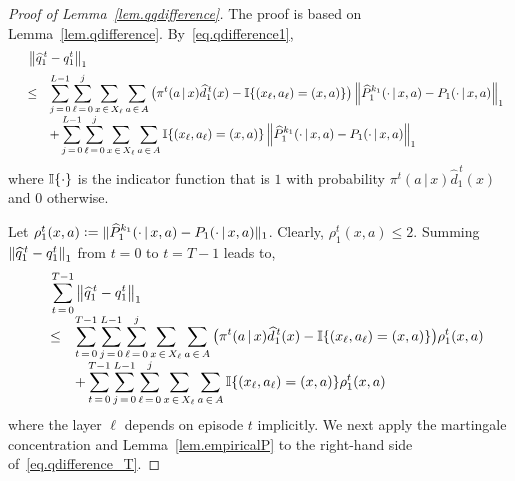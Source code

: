 \documentclass[12pt, final]{l4dc2023}
\begin{document}
\begin{proof}[Proof of Lemma~\ref{lem.qqdifference}]
	The proof is based on Lemma~\ref{lem.qdifference}. By~\eqref{eq.qdifference1}, 
	\[
	\begin{array}{rcl}
	&& \!\!\!\! \!\!\!\! \!\!
	\displaystyle
	\norm{\hat q_1^{\,t} - q_1^t}_1
	\\[0.2cm]
	&\leq&\displaystyle\sum_{j\,=\,0}^{L-1} \sum_{\ell\,=\,0}^{j}\sum_{x\,\in\,X_\ell}\sum_{a\,\in\,A}  \big(\pi^t(a\,\vert\,x) \hat d_1^{\,t}(x) - \Ind{(x_\ell,a_\ell)=(x,a)} \big)\norm{ \hat P_1^{k_1}(\cdot\,\vert\,x,a)-  P_1(\cdot\,\vert\,x,a) }_1
	\\[0.2cm]
	&&\displaystyle+\sum_{j\,=\,0}^{L-1} \sum_{\ell\,=\,0}^{j}\sum_{x\,\in\,X_\ell}\sum_{a\,\in\,A} \Ind{(x_\ell,a_\ell)=(x,a)}\norm{ \hat P_1^{k_1}(\cdot\,\vert\,x,a)-  P_1(\cdot\,\vert\,x,a) }_1
	\end{array}
	\]
	where $\mathbb{I}{\{{\cdot}\}}$ is the indicator function that is $1$ with probability $\pi^t(a\,\vert\,x) \hat d_1^{\,t}(x)$ and $0$ otherwise.
	
	Let $\rho_1^t(x,a) \mathrel{\mathop:}= \Vert{ \widehat P_1^{k_1}(\cdot\,\vert\,x,a)-  P_1(\cdot\,\vert\,x,a) }\Vert_1$. Clearly, $\rho_1^t(x,a) \leq 2$. Summing $\left\|{\widehat q_1^{\,t} - q_1^t}\right\|_1$ from $t=0$ to $t=T-1$ leads to,
	\begin{equation}\label{eq.qdifference_T}
	\begin{array}{rcl}
	&&  \!\!\!\! \!\!\!\! \!\!
	\displaystyle\sum_{t\,=\,0}^{T-1} 
	\norm{\hat q_1^{\,t} - q_1^t}_1
	\\[0.2cm]
	&\leq&\displaystyle \sum_{t\,=\,0}^{T-1} \sum_{j\,=\,0}^{L-1} \sum_{\ell\,=\,0}^{j}\sum_{x\,\in\,X_\ell}\sum_{a\,\in\,A}  \big(\pi^t(a\,\vert\,x) \hat d_1^{\,t}(x) - \Ind{(x_\ell,a_\ell)=(x,a)} \big)\rho_1^t(x,a) 
	\\[0.2cm]
	&&\displaystyle+\sum_{t\,=\,0}^{T-1} \sum_{j\,=\,0}^{L-1} \sum_{\ell\,=\,0}^{j}\sum_{x\,\in\,X_\ell}\sum_{a\,\in\,A} \Ind{(x_\ell,a_\ell)=(x,a)}\rho_1^t(x,a) 
	\end{array}
	\end{equation}
	where the layer $\ell$ depends on episode $t$ implicitly. We next apply the martingale concentration and Lemma~\ref{lem.empiricalP} to the right-hand side of~\eqref{eq.qdifference_T}.
	

\end{proof}
\end{document}
